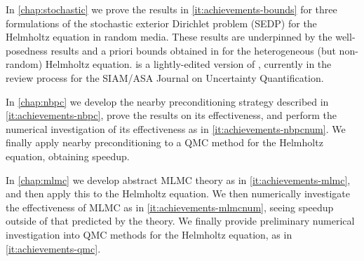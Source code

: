 In \cref{chap:stochastic} we prove the results in \cref{it:achievements-bounds} for three formulations of the stochastic exterior Dirichlet problem (SEDP) for the Helmholtz equation in random media. These results are underpinned by the well-posedness results and a priori bounds obtained in \cite{GrPeSp:19} for the heterogeneous (but non-random) Helmholtz equation.  is a lightly-edited version of \cite{PeSp:19}, currently in the review process for the SIAM/ASA Journal on Uncertainty Quantification.

In \cref{chap:nbpc} we develop the nearby preconditioning strategy described in \cref{it:achievements-nbpc}, prove the results on its effectiveness, and perform the numerical investigation of its effectiveness as in \cref{it:achievements-nbpcnum}. We finally apply nearby preconditioning to a QMC method for the Helmholtz equation, obtaining speedup.

In \cref{chap:mlmc} we develop abstract MLMC theory as in \cref{it:achievements-mlmc}, and then apply this to the Helmholtz equation. We then numerically investigate the effectiveness of MLMC as in \cref{it:achievements-mlmcnum}, seeing speedup outside of that predicted by the theory. We finally provide preliminary numerical investigation into QMC methods for the Helmholtz equation, as in \cref{it:achievements-qmc}.

